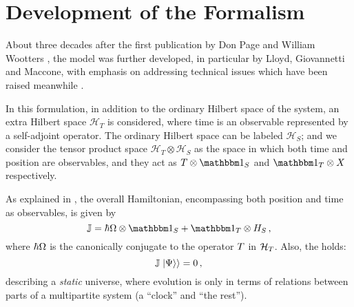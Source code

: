 \section{Development of the Formalism}

About three decades after the first publication by
Don Page and William Wootters \parencite{PageWootters},
the model was further developed,
in particular by Lloyd, Giovannetti and Maccone,
with emphasis on addressing technical issues which have been raised meanwhile
\parencite{Lloyd:Time}.

In this formulation,
in addition to the ordinary Hilbert space of the system,
an extra Hilbert space $\mathcal{H}_T$ is considered,
where time is an observable
represented by a self-adjoint operator.
The ordinary Hilbert space can be labeled $\mathcal{H}_S$;
and we consider the tensor product space $\mathcal{H}_T \otimes \mathcal{H}_S$ as
the space in which both time and position are observables, and they act as
$T \otimes \idop_S$ and $\idop_T \otimes X$
respectively.

As explained in \cite{Lloyd:Time, Maccone:Pauli}, the overall Hamiltonian,
encompassing both position and time as observables, is given by
\begin{equation}\label{eq:pwHamiltonian}
  \op{\mathbb{J}} = \hbar\op{\Omega}\ox\idop_S + \idop_T\ox\op{H}_S \,\text{,}
\end{equation}
where $\hbar{\Omega}$ is the canonically conjugate to the operator ${T}$ in $\mathcal{H}_T$.
Also, the  holds:
\begin{equation}\label{eq:Wheeler-DeWitt}
  {\mathbb{J}}\left.\left| \Psi \right\rangle\right\rangle = 0 \,\text{,}
\end{equation}
describing a \emph{static} universe, where evolution is only
in terms of relations between parts of a multipartite system
(a ``clock'' and ``the rest'').


